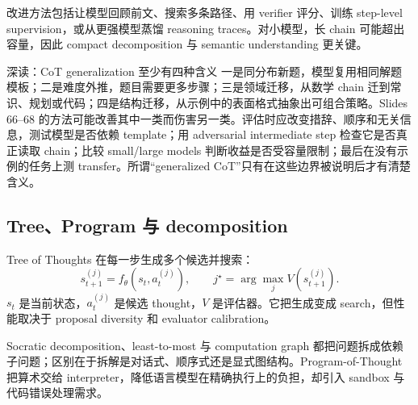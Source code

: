 改进方法包括让模型回顾前文、搜索多条路径、用 verifier 评分、训练 step-level supervision，或从更强模型蒸馏 reasoning traces。对小模型，长 chain 可能超出容量，因此 compact decomposition 与 semantic understanding 更关键。







\begin{knowledgebox}{深读：CoT generalization 至少有四种含义}
一是同分布新题，模型复用相同解题模板；二是难度外推，题目需要更多步骤；三是领域迁移，从数学 chain 迁到常识、规划或代码；四是结构迁移，从示例中的表面格式抽象出可组合策略。Slides 66--68 的方法可能改善其中一类而伤害另一类。评估时应改变措辞、顺序和无关信息，测试模型是否依赖 template；用 adversarial intermediate step 检查它是否真正读取 chain；比较 small/large models 判断收益是否受容量限制；最后在没有示例的任务上测 transfer。所谓“generalized CoT”只有在这些边界被说明后才有清楚含义。
\end{knowledgebox}


\subsection{Tree、Program 与 decomposition}

Tree of Thoughts 在每一步生成多个候选并搜索：
\[
s_{t+1}^{(j)}=f_{\theta}(s_t,a_t^{(j)}),\qquad
j^{\star}=\arg\max_j V(s_{t+1}^{(j)}).
\]
$s_t$ 是当前状态，$a_t^{(j)}$ 是候选 thought，$V$ 是评估器。它把生成变成 search，但性能取决于 proposal diversity 和 evaluator calibration。





Socratic decomposition、least-to-most 与 computation graph 都把问题拆成依赖子问题；区别在于拆解是对话式、顺序式还是显式图结构。Program-of-Thought 把算术交给 interpreter，降低语言模型在精确执行上的负担，却引入 sandbox 与代码错误处理需求。


